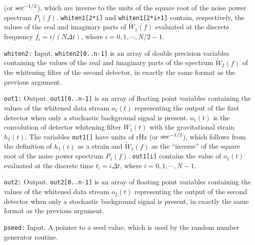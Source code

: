 \begin{description}
(or ${\rm sec}^{-1/2}$), which are inverse to the units of the square 
root of the noise power spectrum $P_1(f)$.
{\tt whiten1[2*i]} and {\tt whiten1[2*i+1]} contain, respectively, 
the values of the real and imaginary parts of $\tilde W_1(f)$
evaluated at the discrete frequency $f_i=i/(N\Delta t)$, where 
$i=0,1,\cdots,N/2-1$.
%
\item{\tt whiten2:} Input. 
{\tt whiten2[0..n-1]} is an array of double precision variables 
containing the values of the real and imaginary parts of the spectrum 
$\tilde W_2(f)$ of the whitening filter of the second detector,
in exactly the same format as the previous argument.
%
\item{\tt out1:} Output.  
{\tt out1[0..n-1]} is an array of floating point variables containing
the values of the whitened data stream $o_1(t)$ representing the 
output of the first detector when only a stochastic background signal 
is present.
$o_1(t)$ is the convolution of detector whitening filter $W_1(t)$
with the gravitational strain $h_1(t)$.
The variables {\tt out1[]} have units of rHz (or ${\rm sec}^{-1/2}$),
which follows from the definition of $h_1(t)$ as a strain and
$\tilde W_1(f)$ as the ``inverse'' of the square root 
of the noise power spectrum $P_1(f)$.
{\tt out1[i]} contains the value of $o_1(t)$ evaluated at the discrete 
time $t_i=i\Delta t$, where $i=0,1,\cdots,N-1$.
%
\item{\tt out2:} Output.  
{\tt out2[0..n-1]} is an array of floating point variables containing
the values of the whitened data stream $o_2(t)$ representing the 
output of the second detector when only a stochastic background signal 
is present,
in exactly the same format as the previous argument.
%
\item{\tt pseed:} Input.  
A pointer to a seed value, which is used by the random number generator
routine.
\end{description}

